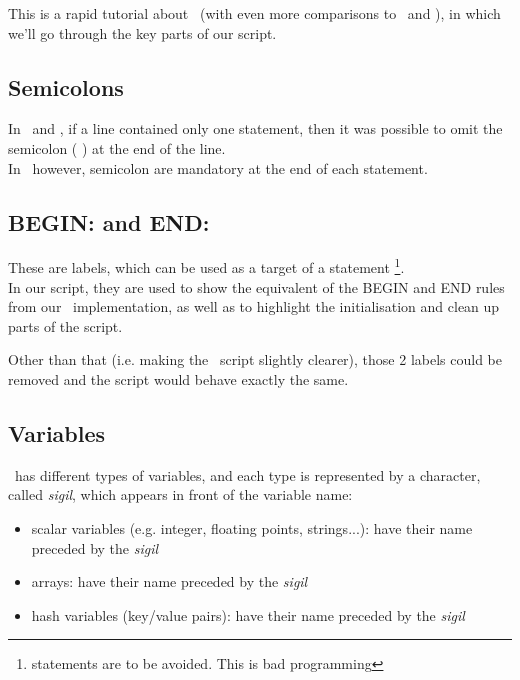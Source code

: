 This is a rapid tutorial about \perl\ (with even more comparisons to \python\ and \awk), in which we'll go through the key parts of our script.


\subsection*{Semicolons}

In \python\ and \awk, if a line contained only one statement, then it was possible to omit the semicolon ( \cmd{;} ) at the end of the line. \\

In \perl\ however, semicolon are mandatory at the end of each statement.


\medskip

\subsection*{BEGIN: and END:}

These are labels, which can be used as a target of a  statement \footnote{ statements are to be avoided. This is bad programming}. \\

In our script, they are used to show the equivalent of the BEGIN and END rules from our \gawk\ implementation, as well as to highlight the initialisation and clean up parts of the script.

Other than that (i.e. making the \perl\ script slightly clearer), those 2 labels could be removed and the script would behave exactly the same.



\newpage

\subsection*{Variables}

\perl\ has different types of variables, and each type is represented by a character, called \emph{sigil}, which appears in front of the variable name:

\begin{itemize}
	\item scalar variables (e.g. integer, floating points, strings...): have their name preceded by the \emph{sigil} \cmd{\$}
	\item arrays: have their name preceded by the \emph{sigil} 
	\item hash variables (key/value pairs): have their name preceded by the \emph{sigil} \cmd{\%}
\end{itemize}

